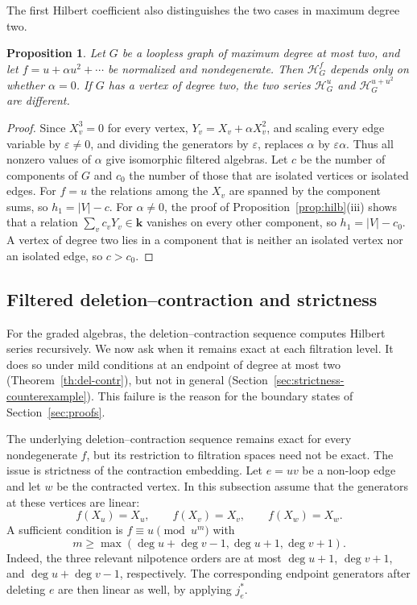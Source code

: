 \documentclass[reqno]{article}
\theoremstyle{plain} %
\newtheorem{proposition}[theorem]{Proposition}
\theoremstyle{definition}
\theoremstyle{remark}
\newcommand{\K} {\mathbf{k}}
\newcommand{\hs}{\mathscr{H}}
\numberwithin{equation}{section}
\begin{document}
The first Hilbert coefficient also distinguishes the two cases in
maximum degree two.

\begin{proposition}\label{prop:max-degree-two}
Let $G$ be a loopless graph of maximum degree at most two, and let
$f=u+\alpha u^2+\cdots$ be normalized and nondegenerate. Then
$\hs^f_G$ depends only on whether $\alpha=0$. If $G$ has a vertex of
degree two, the two series $\hs^u_G$ and $\hs^{u+u^2}_G$ are different.
\end{proposition}
\begin{proof}
Since $X_v^3=0$ for every vertex, $Y_v=X_v+\alpha X_v^2$, and scaling every edge variable by $\varepsilon\ne0$, and dividing the
generators by $\varepsilon$, replaces $\alpha$ by $\varepsilon\alpha$.
Thus all nonzero values of $\alpha$ give isomorphic filtered algebras. Let $c$ be the number of components of $G$ and
$c_0$ the number of those that are isolated vertices or isolated edges.
For $f=u$ the relations among the $X_v$ are spanned by the component sums,
so $h_1=|V|-c$. For $\alpha\ne0$, the proof of
Proposition~\ref{prop:hilb}(iii) shows that a relation
$\sum_vc_vY_v\in\K$ vanishes on every other component, so
$h_1=|V|-c_0$. A vertex of degree two lies in a component
that is neither an isolated vertex nor an isolated edge, so $c>c_0$.
\end{proof}

\subsection{Filtered deletion--contraction and strictness}
\label{sec:filtered-exact}

For the graded algebras, the deletion--contraction sequence computes
Hilbert series recursively. We now ask when it remains exact at each
filtration level. It does so under mild conditions at an endpoint of
degree at most two (Theorem~\ref{th:del-contr}), but not in general
(Section~\ref{sec:strictness-counterexample}). This failure is the
reason for the boundary states of Section~\ref{sec:proofs}.

The underlying deletion--contraction sequence remains exact for every
nondegenerate $f$, but its restriction to filtration spaces need not be
exact. The issue is strictness of the contraction embedding.
Let $e=uv$ be a non-loop edge and let $w$ be the contracted vertex.
In this subsection assume that the generators at these vertices are linear:
\begin{equation}\label{eq:endpoint-linearity}
f(X_u)=X_u,\qquad f(X_v)=X_v,\qquad f(X_w)=X_w.
\end{equation}
A sufficient condition is $f\equiv u\pmod{u^m}$ with
\begin{equation}\label{eq:degs}
m\ge\max(\deg u+\deg v-1,\deg u+1,\deg v+1).
\end{equation}
Indeed, the three relevant nilpotence orders are at most
$\deg u+1$, $\deg v+1$, and $\deg u+\deg v-1$, respectively.
The corresponding endpoint generators after deleting $e$ are then linear
as well, by applying $j_e^*$.
\end{document}
